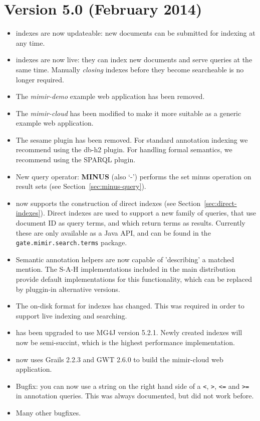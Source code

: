 \section{Version 5.0 (February 2014)}
\begin{itemize}
  \item \Mimir{} indexes are now updateable: new documents can be submitted for
  indexing at any time.
  \item \Mimir{} indexes are now live: they can index new documents and serve
  queries at the same time. Manually {\em closing} indexes before they become
  searcheable is no longer required.
  \item The {\em mimir-demo} example web application has been removed.
  \item The {\em mimir-cloud} has been modified to make it more suitable as a
  generic example web application.
  \item The sesame \Mimir{} plugin has been removed. For standard annotation
  indexing we recommend using the db-h2 plugin. For handling formal semantics,
  we recommend using the SPARQL plugin.
  \item New query operator: {\bf MINUS} (also `-') performs the set minus
  operation on result sets (see Section~\ref{sec:minus-query}).  
  \item \Mimir{} now supports the construction of direct indexes (see
  Section~\ref{sec:direct-indexes}). Direct indexes are used to support a new
  family of queries, that use document ID as query terms, and which return terms
  as results. Currently these are only available as a Java API, and can be found
  in the {\tt gate.mimir.search.terms} package.
  \item Semantic annotation helpers are now capable of 'describing' a matched
  mention. The S-A-H implementations included in the main distribution provide
  default implementations for this functionality, which can be replaced by
  pluggin-in alternative versions.
  \item The on-disk format for \Mimir{} indexes has changed. This was required
  in order to support live indexing  and searching.
  \item \Mimir{} has been upgraded to use MG4J version 5.2.1. Newly created
  indexes will now be semi-succint, which is the highest performance
  implementation.
  \item \Mimir{} now uses Grails 2.2.3 and GWT 2.6.0 to build the mimir-cloud
  web application.
  \item Bugfix: you can now use a string on the right hand side of a \verb!<!,
  \verb!>!, \verb!<=! and \verb!>=! in annotation queries. This was always
  documented, but did not work before.
  \item Many other bugfixes.
\end{itemize}
